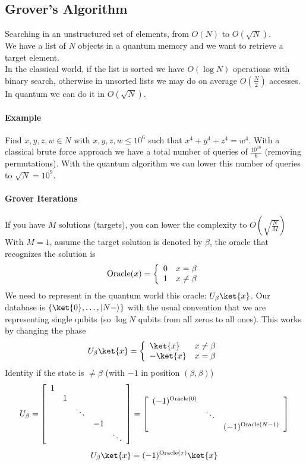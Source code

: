 \documentclass[10pt]{report}
\begin{document}
\subsection{Grover's Algorithm} 
Searching in an unstructured set of elements, from $O(N)$ to $O(\sqrt{N})$.\\We have a list of $N$ objects in a quantum memory and we want to retrieve a target element.\\
In the classical world, if the list is sorted we have $O(\log N)$ operations with binary search, otherwise in unsorted lists we may do on average $O(\frac{N}{2})$ accesses. In quantum we can do it in $O(\sqrt{N})$.
\paragraph{Example} Find $x,y,z,w\in N$ with $x,y,z,w\leq 10^6$ such that $x^4+y^4+z^4=w^4$. With a classical brute force approach we have a total number of queries of $\frac{10^{18}}{6}$ (removing permutations). With the quantum algorithm we can lower this number of queries to $\sqrt{N} = 10^9$.
\paragraph{Grover Iterations} If you have $M$ solutions (targets), you can lower the complexity to $O\left(\sqrt{\frac{N}{M}}\right)$\\
With $M=1$, assume the target solution is denoted by $\beta$, the oracle that recognizes the solution is $$\hbox{Oracle}(x) = \left\{\begin{array}{c l}
0&x=\beta\\1&x\neq\beta
\end{array}\right.$$
We need to represent in the quantum world this oracle: $U_\beta\ket{x}$. Our database is $\{\ket{0},\ldots,|N-\rangle\}$ with the usual convention that we are representing single qubits (so $\log N$ qubits from all zeros to all ones). This works by changing the phase
$$U_\beta\ket{x}=\left\{\begin{array}{l l}
\ket{x}&x\neq\beta\\-\ket{x}&x=\beta
\end{array}\right.$$
Identity if the state is $\neq\beta$ (with $-1$ in position $(\beta,\beta)$)
$$U_\beta = \left[\begin{array}{c c c c c}
1\\
&1\\
& &\ddots\\
& & &-1\\
& & & &\ddots\\
\end{array}\right] = \left[\begin{array}{cc c}
(-1)^{\text{Oracle}(0)}\\
&\ddots\\
& & (-1)^{\text{Oracle}(N-1)}\\
\end{array}\right]$$
$$U_\beta\ket{x}=(-1)^{\text{Oracle}(x)}\ket{x}$$
\end{document}
